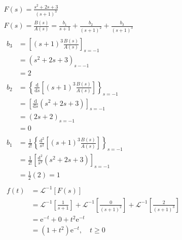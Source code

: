 \begin{gather*}
    F(s)=\frac{s^{2}+2 s+3}{(s+1)^{3}}\\
    F(s)=\frac{B(s)}{A(s)}=\frac{b_{1}}{s+1}+\frac{b_{2}}{(s+1)^{2}}+\frac{b_{3}}{(s+1)^{3}}\\
    \begin{aligned} b_{3} &=\left[(s+1)^{3} \frac{B(s)}{A(s)}\right]_{s=-1} \\ &=\left(s^{2}+2 s+3\right)_{s--1} \\ &=2 \end{aligned}\\
    \begin{aligned} b_{2} &=\left\{\frac{\mathrm{d}}{\mathrm{d} s}\left[(s+1)^{3} \frac{B(s)}{A(s)}\right]\right\}_{s=-1} \\ &=\left[\frac{\mathrm{d}}{\mathrm{d} s}\left(s^{2}+2 s+3\right)\right]_{s=-1} \\ &=(2 s+2)_{s=-1} \\ &=0 \end{aligned}\\
    \begin{aligned} b_{1} &=\frac{1}{2 !}\left\{\frac{\mathrm{d}^{2}}{s^{2}}\left[(s+1)^{3} \frac{B(s)}{A(s)}\right]\right\}_{s=-1} \\ &=\frac{1}{2 !}\left[\frac{\mathrm{d}^{2}}{s^{2}}\left(s^{2}+2 s+3\right)\right]_{s=-1} \\ &=\frac{1}{2}(2)=1 \end{aligned}\\
    \begin{aligned} f(t) &=\mathscr{L}^{-1}[F(s)] \\ &=\mathscr{L}^{-1}\left[\frac{1}{s+1}\right]+\mathscr{L}^{-1}\left[\frac{0}{(s+1)^{2}}\right]+\mathscr{L}^{-1}\left[\frac{2}{(s+1)^{3}}\right] \\ &=\mathrm{e}^{-t}+0+t^{2} \mathrm{e}^{-t} \\ &=\left(1+t^{2}\right) \mathrm{e}^{-t}, \quad t \geq 0 \end{aligned}
\end{gather*}

